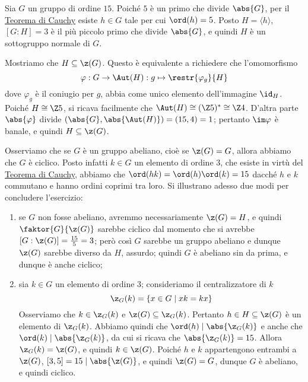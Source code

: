 \documentclass[11pt]{scrartcl}
\begin{document}
	\begin{soln}
		Sia $G$ un gruppo di ordine $15$. Poiché $5$ è un primo che divide $\abs{G}$,
		per il \hyperref[teorema1.44]{Teorema di Cauchy} esiste $h \in G$ tale per cui $\ord(h) = 5$. Posto $H = \langle h\rangle$, $[G:H] = 3$ è il più piccolo primo che divide $\abs{G}$, e quindi $H$ è un sottogruppo 
		normale di $G$. \medskip
		
		
		Mostriamo che $H \subseteq \z(G)$. Questo è equivalente a 
		richiedere che l'omomorfismo \[
		\varphi: G \to \Aut(H) : g \mapsto \restr{\varphi_{g}}{H}
		\]
		dove $\varphi_g$ è il coniugio per $g$, abbia come unico elemento dell'immagine
		$\id_H$.
		Poiché $H \cong \Z5$, si ricava facilmente che $\Aut(H) \cong (\Z5)^* \cong \Z4$. D'altra 
		parte $\abs{\varphi}$ divide $(\abs{G}, \abs{\Aut(H)}) = (15, 4) = 1$; pertanto
		$\im \varphi$ è banale, e quindi $H \subseteq \z(G)$. \medskip
		
		
		Osserviamo che se $G$ è un gruppo abeliano, cioè se $\z(G) = G$,
		allora abbiamo che $G$ è ciclico. Posto infatti $k \in G$ un elemento di 
		ordine $3$, che esiste in virtù del \hyperref[teorema1.44]{Teorema di Cauchy},
		abbiamo che $\ord(hk) = \ord(h)\ord(k) = 15$ dacché $h$ e $k$ commutano e hanno
		ordini coprimi tra loro.
		Si illustrano adesso due modi per concludere l'esercizio:
		\begin{enumerate}[(1)]
			\item se $G$ non fosse abeliano, avremmo 
			necessariamente $\z(G) = H$, e quindi $\faktor{G}{\z(G)}$ sarebbe ciclico 
			dal momento che si avrebbe $[G : \z(G)] = \frac{15}{5} = 3$; però così $G$ sarebbe un gruppo abeliano e dunque $\z(G)$ sarebbe diverso da $H$, assurdo; quindi $G$
			è abeliano sin da prima, e dunque è anche ciclico;
			\item sia $k \in G$ un elemento di ordine 3; consideriamo il centralizzatore
			di $k$
			\[
			\z_G(k) = \{x \in G\mid xk = kx\}
			\]Osserviamo che $k \in \z_G(k)$ e $\z(G) \subseteq \z_G(k)$. Pertanto $h \in H \subseteq \z(G)$ è un elemento 
			di $\z_G(k)$. Abbiamo quindi che $\ord(h)\mid \abs{\z_G(k)}$ e anche che $\ord(k)\mid \abs{\z_G(k)}$, 
			da cui si ricava che $\abs{\z_G(k)} = 15$. Allora $\z_G(k) = \z(G)$, e quindi
			$k \in \z(G)$. Poiché $h$ e $k$ appartengono entrambi a $\z(G)$,
			$[3, 5] = 15 \mid \abs{\z(G)}$, e quindi $\z(G) = G$, dunque
			$G$ è abeliano, e quindi ciclico.
		\end{enumerate}
	\end{soln}
	
\end{document}
